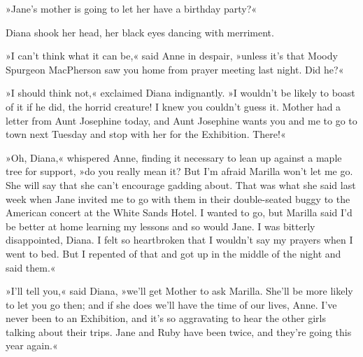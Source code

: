 »Jane’s mother is going to let her have a birthday party?«

Diana shook her head, her black eyes dancing with merriment.

»I can’t think what it can be,« said Anne in despair, »unless it’s that Moody Spurgeon MacPherson saw you home from prayer meeting last night. Did he?«

»I should think not,« exclaimed Diana indignantly. »I wouldn’t be likely to boast of it if he did, the horrid creature! I knew you couldn’t guess it. Mother had a letter from Aunt Josephine today, and Aunt Josephine wants you and me to go to town next Tuesday and stop with her for the Exhibition. There!«

»Oh, Diana,« whispered Anne, finding it necessary to lean up against a maple tree for support, »do you really mean it? But I’m afraid Marilla won’t let me go. She will say that she can’t encourage gadding about. That was what she said last week when Jane invited me to go with them in their double-seated buggy to the American concert at the White Sands Hotel. I wanted to go, but Marilla said I’d be better at home learning my lessons and so would Jane. I was bitterly disappointed, Diana. I felt so heartbroken that I wouldn’t say my prayers when I went to bed. But I repented of that and got up in the middle of the night and said them.«

»I’ll tell you,« said Diana, »we’ll get Mother to ask Marilla. She’ll be more likely to let you go then; and if she does we’ll have the time of our lives, Anne. I’ve never been to an Exhibition, and it’s so aggravating to hear the other girls talking about their trips. Jane and Ruby have been twice, and they’re going this year again.«

